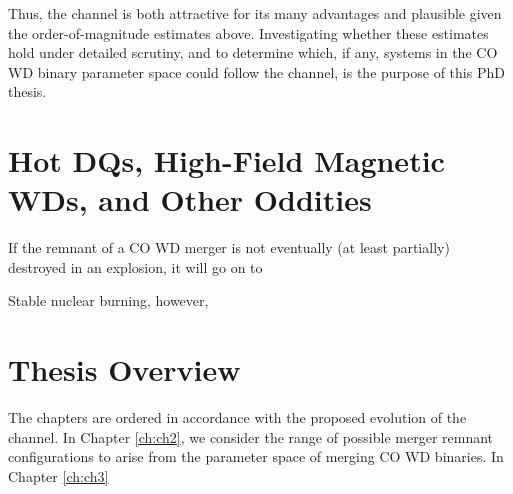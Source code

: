 Thus, the \citeal{vkercj10} channel is both attractive for its many advantages and plausible given the order-of-magnitude estimates above.  Investigating whether these estimates hold under detailed scrutiny, and to determine which, if any, systems in the CO WD binary parameter space could follow the channel, is the purpose of this PhD thesis.

\section{Hot DQs, High-Field Magnetic WDs, and Other Oddities}

If the remnant of a CO WD merger is not eventually (at least partially) destroyed in an explosion, it will go on to 


Stable nuclear burning, however, 




\section{Thesis Overview}

The chapters are ordered in accordance with the proposed evolution of the \citeal{vkercj10} channel.  In Chapter \ref{ch:ch2}, we consider the range of possible merger remnant configurations to arise from the parameter space of merging CO WD binaries.  In Chapter \ref{ch:ch3}

